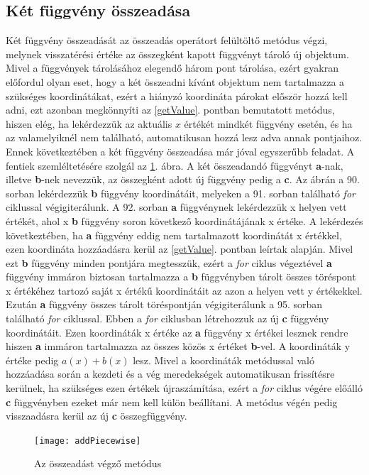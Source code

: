 \subsection{Két függvény összeadása} \label{addPiecewiseLinearFunction}
Két függvény összeadását az összeadás operátort felültöltő metódus végzi, melynek visszatérési értéke az összegként kapott függvényt tároló új  objektum.
Mivel a függvények tárolásához elegendő három pont tárolása, ezért gyakran előfordul olyan eset, hogy a két összeadni kívánt  objektum nem tartalmazza a szükséges koordinátákat, ezért a hiányzó koordináta párokat először hozzá kell adni, ezt azonban megkönnyíti az \ref{getValue}. pontban bemutatott metódus, hiszen elég, ha lekérdezzük az aktuális $x$ értékét mindkét függvény esetén, és ha az valamelyiknél nem található, automatikusan hozzá lesz adva annak pontjaihoz.
Ennek következtében a két függvény összeadása már jóval egyszerűbb feladat.
A fentiek szemléltetésére szolgál az \ref{add_piecewise}. ábra.
A két összeadandó függvényt \textbf{a}-nak, illetve \textbf{b}-nek nevezzük, az összegként adott új függvény pedig a \textbf{c}.
Az ábrán a 90. sorban lekérdezzük \textbf{b} függvény koordinátáit, melyeken a 91. sorban található \textit{for} ciklussal végigiterálunk.
A 92. sorban \textbf{a} függvénynek lekérdezzük x helyen vett értékét, ahol x \textbf{b} függvény soron következő koordinátájának x értéke.
A lekérdezés következtében, ha \textbf{a} függvény eddig nem tartalmazott koordinátát x értékkel, ezen koordináta hozzáadásra kerül az \ref{getValue}. pontban leírtak alapján.
Mivel ezt \textbf{b} függvény minden pontjára megtesszük, ezért a \textit{for} ciklus végeztével \textbf{a} függvény immáron biztosan tartalmazza a \textbf{b} függvényben tárolt összes töréspont x értékéhez tartozó saját x értékű koordinátáit az azon a helyen vett y értékekkel.
Ezután \textbf{a} függvény összes tárolt töréspontján végigiterálunk a 95. sorban található \textit{for} ciklussal.
Ebben a \textit{for} ciklusban létrehozzuk az új \textbf{c} függvény koordinátáit.
Ezen koordináták x értéke az \textbf{a} függvény x értékei lesznek rendre hiszen \textbf{a} immáron tartalmazza az összes közös x értéket \textbf{b}-vel.
A koordináták y értéke pedig $a(x)+b(x)$ lesz.
Mivel a koordináták  metódussal való hozzáadása során a kezdeti és a vég meredekségek automatikusan frissítésre kerülnek, ha szükséges ezen értékek újraszámítása, ezért a \textit{for} ciklus végére előálló \textbf{c} függvényben ezeket már nem kell külön beállítani.
A metódus végén pedig visszaadásra kerül az új \textbf{c} összegfüggvény. 
\begin{figure}
\begin{center}
\texttt{[image: addPiecewise]}
\caption{Az összeadást végző metódus}
\label{add_piecewise}
\end{center}
\end{figure}
